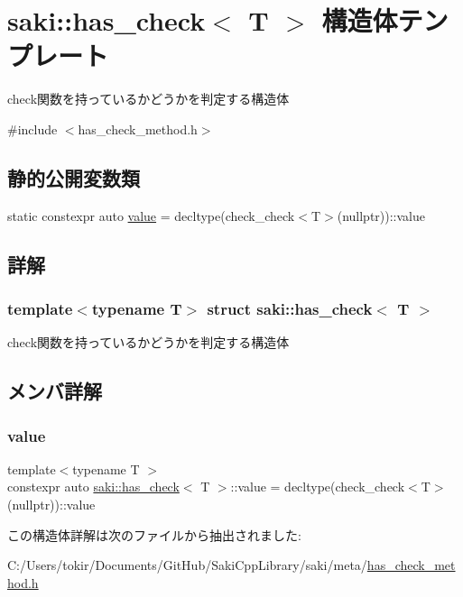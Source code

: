 \hypertarget{structsaki_1_1has__check}{}\section{saki\+:\+:has\+\_\+check$<$ T $>$ 構造体テンプレート}
\label{structsaki_1_1has__check}


check関数を持っているかどうかを判定する構造体  




{\ttfamily \#include $<$has\+\_\+check\+\_\+method.\+h$>$}

\subsection*{静的公開変数類}
\begin{DoxyCompactItemize}
\item 
static constexpr auto \mbox{\hyperlink{structsaki_1_1has__check_aaf5325bde7c74e8afe2a69f8d657d62b}{value}} = decltype(check\+\_\+check$<$T$>$(nullptr))\+::value
\end{DoxyCompactItemize}


\subsection{詳解}
\subsubsection*{template$<$typename T$>$\newline
struct saki\+::has\+\_\+check$<$ T $>$}

check関数を持っているかどうかを判定する構造体 

\subsection{メンバ詳解}
\mbox{\label{structsaki_1_1has__check_aaf5325bde7c74e8afe2a69f8d657d62b}} 
\subsubsection{\texorpdfstring{value}{value}}
{\footnotesize\ttfamily template$<$typename T $>$ \\
constexpr auto \mbox{\hyperlink{structsaki_1_1has__check}{saki\+::has\+\_\+check}}$<$ T $>$\+::value = decltype(check\+\_\+check$<$T$>$(nullptr))\+::value\hspace{0.3cm}{\ttfamily [static]}}



この構造体詳解は次のファイルから抽出されました\+:\begin{DoxyCompactItemize}
\item 
C\+:/\+Users/tokir/\+Documents/\+Git\+Hub/\+Saki\+Cpp\+Library/saki/meta/\mbox{\hyperlink{has__check__method_8h}{has\+\_\+check\+\_\+method.\+h}}\end{DoxyCompactItemize}
